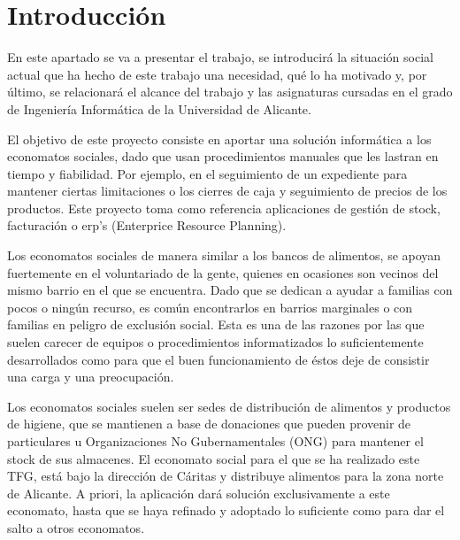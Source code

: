 
\chapter{Introducción}
En este apartado se va a presentar el trabajo, se introducirá la situación social actual que ha hecho de este trabajo una necesidad, qué lo ha motivado y, por último, se relacionará el alcance del trabajo y las asignaturas cursadas en el grado de Ingeniería Informática de la Universidad de Alicante.
\par El objetivo de este proyecto consiste en aportar una solución informática a los economatos sociales, dado que usan procedimientos manuales que les lastran en tiempo y fiabilidad. Por ejemplo, en el seguimiento de un expediente para mantener ciertas limitaciones o los cierres de caja y seguimiento de precios de los productos. Este proyecto toma como referencia aplicaciones de gestión de stock, facturación o erp's (Enterprice Resource Planning).
\par Los economatos sociales de manera similar a los bancos de alimentos, se apoyan fuertemente en el voluntariado de la gente, quienes en ocasiones son vecinos del mismo barrio en el que se encuentra. Dado que se dedican a ayudar a familias con pocos o ningún recurso, es común encontrarlos en barrios marginales o con familias en peligro de exclusión social. Esta es una de las razones por las que suelen carecer de equipos o procedimientos informatizados lo suficientemente desarrollados como para que el buen funcionamiento de éstos deje de consistir una carga y una preocupación.
\par Los economatos sociales suelen ser sedes de distribución de alimentos y productos de higiene, que se mantienen a base de donaciones que pueden provenir de particulares u Organizaciones No Gubernamentales (ONG) para mantener el stock de sus almacenes. El economato social para el que se ha realizado este TFG, está bajo la dirección de Cáritas y distribuye alimentos para la zona norte de Alicante. A priori, la aplicación dará solución exclusivamente a este economato, hasta que se haya refinado y adoptado lo suficiente como para dar el salto a otros economatos.
